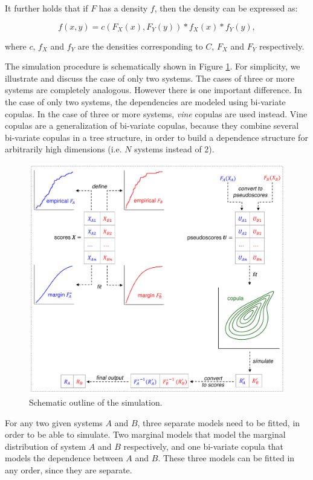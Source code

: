 It further holds that if $F$ has a density $f$, then the density can be expressed as:

\begin{equation}\label{eq:cop-density}
	f(x,y) = c(F_X(x), F_Y(y)) * f_X(x) * f_Y(y),  
\end{equation}

where $c$, $f_X$ and $f_Y$ are the densities corresponding to $C$, $F_X$ and $F_Y$ respectively.

The simulation procedure is schematically shown in Figure \ref{fig:sim-diag}. For simplicity, we illustrate and discuss the case of only two systems. The cases of three or more systems are completely analogous. However there is one important difference. In the case of only two systems, the dependencies are modeled using bi-variate copulas. In the case of three or more systems, \textit{vine} copulas are used instead. Vine copulas are a generalization of bi-variate copulas, because they combine several bi-variate copulas in a tree structure, in order to build a dependence structure for arbitrarily high dimensions (i.e. $N$ systems instead of 2). 

\begin{figure}[t]
	\centering	
	\includegraphics[width=.9\linewidth]{../diagrams/diag1_simulation}
	\caption{Schematic outline of the simulation.}	
	\label{fig:sim-diag}
\end{figure}

For any two given systems $A$ and $B$, three separate models need to be fitted, in order to be able to simulate. Two marginal models that model the marginal distribution of system $A$ and $B$ respectively, and one bi-variate copula that models the dependence between $A$ and $B$. These three models can be fitted in any order, since they are separate. 

